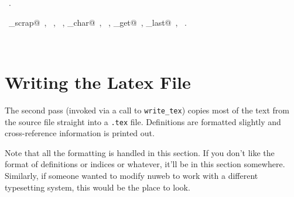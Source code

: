 \documentclass{report}
\begin{document}
\begin{flushleft}
\begin{minipage}{\linewidth}
\begin{list}{}{\setlength{\itemsep}{-\parsep}\setlength{\itemindent}{-\leftmargin}}
\item \NWtxtMacroRefIn\ .
\end{list}
\vspace{-2ex}
\footnotesize\addtolength{\baselineskip}{-1ex}
\begin{list}{}{\setlength{\itemsep}{-\parsep}\setlength{\itemindent}{-\leftmargin}}
\item \NWtxtIdentsUsed\nobreak\  \verb@copy_scrap@\nobreak\ , \verb@fprintf@\nobreak\ , \verb@fputs@\nobreak\ , \verb@nw_char@\nobreak\ , \verb@scraps@\nobreak\ , \verb@source_get@\nobreak\ , \verb@source_last@\nobreak\ , \verb@TRUE@\nobreak\ .\end{list}
\end{minipage}\\[4ex]
\end{flushleft}
\section{Writing the Latex File} \label{latex-file}

The second pass (invoked via a call to \verb|write_tex|) copies most of
the text from the source file straight into a \verb|.tex| file.
Definitions are formatted slightly and cross-reference information is
printed out.

Note that all the formatting is handled in this section.
If you don't like the format of definitions or indices or whatever,
it'll be in this section somewhere. Similarly, if someone wanted to
modify nuweb to work with a different typesetting system, this would
be the place to look.
\end{document}
